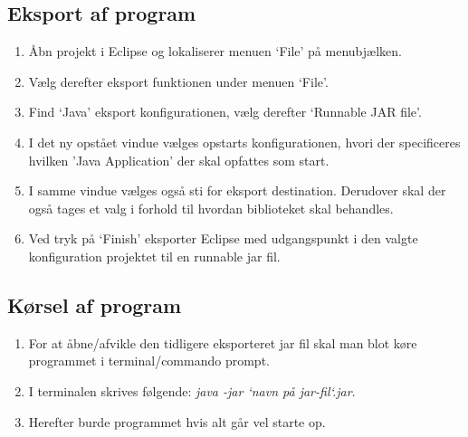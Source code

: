 \subsection{Eksport af program}
\begin{enumerate}   
    \item Åbn projekt i Eclipse og lokaliserer menuen ‘File’ på menubjælken.
    \item Vælg derefter eksport funktionen under menuen ‘File’.
    \item Find ‘Java’ eksport konfigurationen, vælg derefter ‘Runnable JAR file’.
    \item I det ny opstået vindue vælges opstarts konfigurationen, hvori der specificeres hvilken ’Java Application’ der skal opfattes som start.
    \item I samme vindue vælges også sti for eksport destination. Derudover skal der også tages et valg i forhold til hvordan biblioteket skal behandles. 
    \item Ved tryk på ‘Finish’ eksporter Eclipse med udgangspunkt i den valgte konfiguration projektet til en runnable jar fil.\\
\end{enumerate}

\subsection{Kørsel af program}
\begin{enumerate}   
    \item For at åbne/afvikle den tidligere eksporteret jar fil skal man blot køre programmet i terminal/commando prompt.
    \item I terminalen skrives følgende: \textit{java -jar ‘navn på jar-fil‘.jar}.
    \item Herefter burde programmet hvis alt går vel starte op.\\    
\end{enumerate}